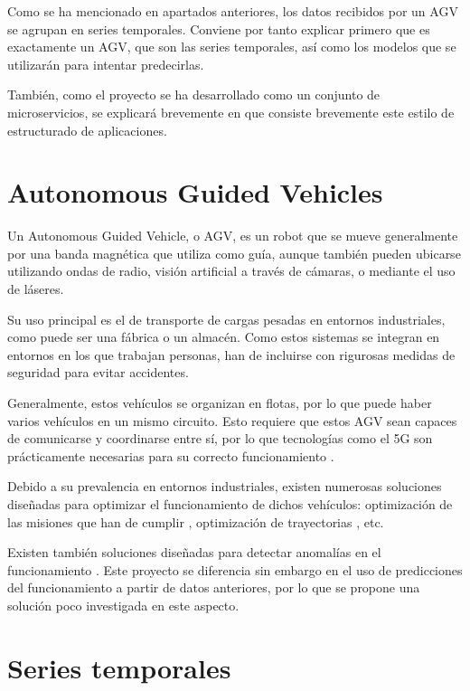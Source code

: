
Como se ha mencionado en apartados anteriores, los datos recibidos por un AGV se agrupan en series temporales. Conviene por tanto explicar
primero que es exactamente un AGV, que son las series temporales, así como los modelos que se utilizarán para intentar predecirlas.

También, como el proyecto se ha desarrollado como un conjunto de microservicios, se explicará brevemente en 
que consiste brevemente este estilo de estructurado de aplicaciones.

\section{Autonomous Guided Vehicles}

Un Autonomous Guided Vehicle, o AGV, es un robot que se mueve generalmente por una banda magnética que utiliza 
como guía, aunque también pueden ubicarse utilizando ondas de radio, visión artificial a través de cámaras,
o mediante el uso de láseres.

Su uso principal es el de transporte de cargas pesadas en entornos industriales, como puede ser una fábrica 
o un almacén. Como estos sistemas se integran en entornos en los que trabajan personas, han de incluirse con 
rigurosas medidas de seguridad para evitar accidentes.

Generalmente, estos vehículos se organizan en flotas, por lo que puede haber varios vehículos en un mismo circuito.
Esto requiere que estos AGV sean capaces de comunicarse y coordinarse entre sí, por lo que tecnologías como el 5G 
son prácticamente necesarias para su correcto funcionamiento \cite{10.1007/978-3-030-50426-7_25}.

Debido a su prevalencia en entornos industriales, existen numerosas soluciones diseñadas para optimizar 
el funcionamiento de dichos vehículos: optimización de las misiones que han de cumplir \cite{XIDIAS201134},
optimización de trayectorias \cite{8022960}, etc. 

Existen también soluciones diseñadas para detectar anomalías en el funcionamiento \cite{9341386}. Este proyecto
se diferencia sin embargo en el uso de predicciones del funcionamiento a partir de datos anteriores, por lo 
que se propone una solución poco investigada en este aspecto.

\section{Series temporales}

